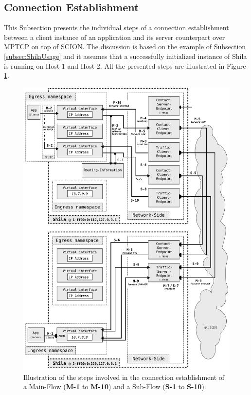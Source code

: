 \subsection{Connection Establishment}
\label{subsec:ShilaConnectionEstablishment}

This Subsection presents the individual steps of a connection establishment between a client instance of an application and its server counterpart over MPTCP on top of SCION. The discussion is based on the example of Subsection \ref{subsec:ShilaUsage} and it assumes that a successfully initialized instance of Shila is running on Host 1 and Host 2. All the presented steps are illustrated in Figure \ref{fig:ShilaIllustrationConnectionEstablishment}. 

\begin{figure}
	\begin{center}
		\def\svgwidth{1\textwidth}
		\includegraphics[scale=0.2]{../illustrations/shilaIntroduction/ConnectionEstablishment.pdf}   
		\caption[Caption for the list of figures.]{Illustration of the steps involved in the connection establishment of a Main-Flow (\textbf{M-1} to \textbf{M-10}) and a Sub-Flow (\textbf{S-1} to \textbf{S-10}).}
		\label{fig:ShilaIllustrationConnectionEstablishment}
	\end{center}
\end{figure}


